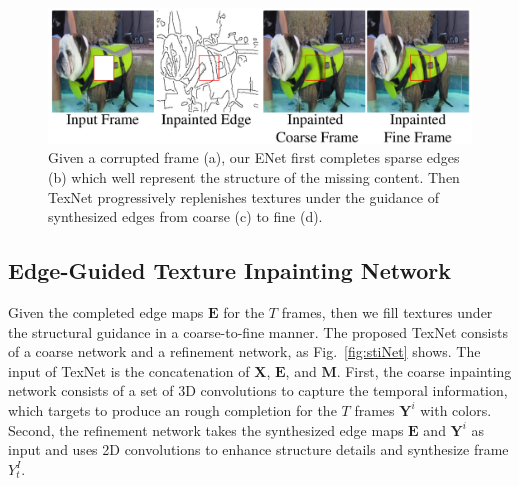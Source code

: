 \begin{figure}[t]
	\centering
	\includegraphics[width=1.0\columnwidth]{coars-fine} %
	\caption{Given a corrupted frame (a), our ENet first completes sparse edges (b) which well represent the structure of the missing content. Then TexNet progressively replenishes textures under the guidance of synthesized edges from coarse (c) to fine (d).}
	
	\label{fig:coarse-fine}
\end{figure}



\subsection{Edge-Guided Texture Inpainting Network}


Given the completed edge maps $\boldsymbol{E}$ for the 
$T$ frames, then we fill textures under the structural guidance in a coarse-to-fine manner. 
%
The proposed TexNet consists of a coarse network and a refinement network, as Fig.~\ref{fig:stiNet} shows.
%
The input of TexNet is the concatenation of $\boldsymbol{X}$, $\boldsymbol{E}$, and $\boldsymbol{M}$.
First, the coarse inpainting network consists of a set of 3D convolutions to capture the temporal information, which targets to produce an rough completion for the $T$ frames  $\boldsymbol{Y}^i$ with colors.
Second, the refinement network takes the synthesized edge maps $\boldsymbol{E}$ and $\boldsymbol{Y}^i$ as input and uses 2D convolutions to enhance structure details and synthesize frame $Y^I_t$. 



